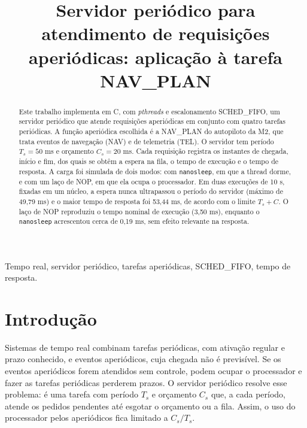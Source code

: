 \documentclass[conference,a4paper]{IEEEtran}
\begin{document}
\title{Servidor periódico para atendimento de requisições aperiódicas: aplicação à tarefa NAV\_PLAN}

\author{
}

\maketitle

\begin{abstract}
Este trabalho implementa em C, com \emph{pthreads} e escalonamento SCHED\_FIFO, um servidor periódico que atende requisições aperiódicas em conjunto com quatro tarefas periódicas. A função aperiódica escolhida é a NAV\_PLAN do autopiloto da M2, que trata eventos de navegação (NAV) e de telemetria (TEL). O servidor tem período $T_s=50$ ms e orçamento $C_s=20$ ms. Cada requisição registra os instantes de chegada, início e fim, dos quais se obtêm a espera na fila, o tempo de execução e o tempo de resposta. A carga foi simulada de dois modos: com \texttt{nanosleep}, em que a thread dorme, e com um laço de NOP, em que ela ocupa o processador. Em duas execuções de 10 s, fixadas em um núcleo, a espera nunca ultrapassou o período do servidor (máximo de 49,79 ms) e o maior tempo de resposta foi 53,44 ms, de acordo com o limite $T_s+C$. O laço de NOP reproduziu o tempo nominal de execução (3,50 ms), enquanto o \texttt{nanosleep} acrescentou cerca de 0,19 ms, sem efeito relevante na resposta.
\end{abstract}

\begin{IEEEkeywords}
Tempo real, servidor periódico, tarefas aperiódicas, SCHED\_FIFO, tempo de resposta.
\end{IEEEkeywords}

\section{Introdução}
Sistemas de tempo real combinam tarefas periódicas, com ativação regular e prazo conhecido, e eventos aperiódicos, cuja chegada não é previsível. Se os eventos aperiódicos forem atendidos sem controle, podem ocupar o processador e fazer as tarefas periódicas perderem prazos. O servidor periódico resolve esse problema: é uma tarefa com período $T_s$ e orçamento $C_s$ que, a cada período, atende os pedidos pendentes até esgotar o orçamento ou a fila. Assim, o uso do processador pelos aperiódicos fica limitado a $C_s/T_s$.
\end{document}
